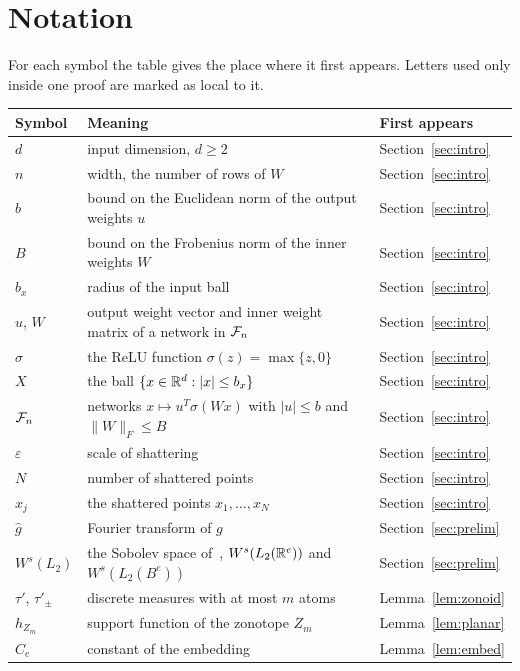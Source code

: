 \section{Notation}\label{app:notation}
For each symbol the table gives the place where it first appears. Letters used only inside one proof are marked as local to it.

{\small
\begin{longtable}{@{}p{}p{}l@{}}
\toprule
Symbol & Meaning & First appears \\ \midrule
\endhead
$d$ & input dimension, $d\ge2$ & Section~\ref{sec:intro} \\
$n$ & width, the number of rows of $W$ & Section~\ref{sec:intro} \\
$b$ & bound on the Euclidean norm of the output weights $u$ & Section~\ref{sec:intro} \\
$B$ & bound on the Frobenius norm of the inner weights $W$ & Section~\ref{sec:intro} \\
$b_x$ & radius of the input ball & Section~\ref{sec:intro} \\
$u$, $W$ & output weight vector and inner weight matrix of a network in $\mathcal{F}_n$ & Section~\ref{sec:intro} \\
$\sigma$ & the ReLU function $\sigma(z)=\max\{z,0\}$ & Section~\ref{sec:intro} \\
$X$ & the ball $\{x\in\mathbb{R}^d:|x|\le b_x\}$ & Section~\ref{sec:intro} \\
$\mathcal{F}_n$ & networks $x\mapsto u^{T}\sigma(Wx)$ with $|u|\le b$ and $\|W\|_F\le B$ & Section~\ref{sec:intro} \\
$\varepsilon$ & scale of shattering & Section~\ref{sec:intro} \\
$N$ & number of shattered points & Section~\ref{sec:intro} \\
$x_j$ & the shattered points $x_1,\dots,x_N$ & Section~\ref{sec:intro} \\
$\hat g$ & Fourier transform of $g$ & Section~\ref{sec:prelim} \\
$W^s(L_2)$ & the Sobolev space of~\cite{MSX}, $W^s(L_2(\mathbb{R}^e))$ and $W^s(L_2(B^e))$ & Section~\ref{sec:prelim} \\
$\tau'$, $\tau'_\pm$ & discrete measures with at most $m$ atoms & Lemma~\ref{lem:zonoid} \\
$h_{Z_m}$ & support function of the zonotope $Z_m$ & Lemma~\ref{lem:planar} \\
$C_e$ & constant of the embedding & Lemma~\ref{lem:embed} \\

\end{longtable}}
